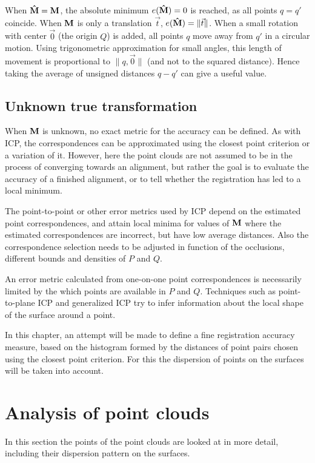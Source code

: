 When $\mathbf{\hat{M}} = \mathbf{M}$, the absolute minimum $e(\mathbf{\hat{M}}) = 0$ is reached, as all points $q = q'$ coincide. When $\mathbf{M}$ is only a translation $\vec{t}$, $e(\mathbf{\hat{M}}) = \| \vec{t} \|$. When a small rotation with center $\vec{0}$ (the origin $Q$) is added, all points $q$ move away from $q'$ in a circular motion. Using trigonometric approximation for small angles, this length of movement is proportional to $\| q, \vec{0 }\|$ (and not to the squared distance). Hence taking the average of unsigned distances $q - q'$ can give a useful value.


\subsection{Unknown true transformation}
When $\mathbf{M}$ is unknown, no exact metric for the accuracy can be defined. As with ICP, the correspondences can be approximated using the closest point criterion or a variation of it. However, here the point clouds are not assumed to be in the process of converging towards an alignment, but rather the goal is to evaluate the accuracy of a finished alignment, or to tell whether the registration has led to a local minimum.

The point-to-point or other error metrics used by ICP depend on the estimated point correspondences, and attain local minima for values of $\mathbf{M}$ where the estimated correspondences are incorrect, but have low average distances. Also the correspondence selection needs to be adjusted in function of the occlusions, different bounds and densities of $P$ and $Q$. 

An error metric calculated from one-on-one point correspondences is necessarily limited by the which points are available in $P$ and $Q$. Techniques such as point-to-plane ICP and generalized ICP try to infer information about the local shape of the surface around a point.

In this chapter, an attempt will be made to define a fine registration accuracy measure, based on the histogram formed by the distances of point pairs chosen using the closest point criterion. For this the dispersion of points on the surfaces will be taken into account. 


\section{Analysis of point clouds}
In this section the points of the point clouds are looked at in more detail, including their dispersion pattern on the surfaces.

